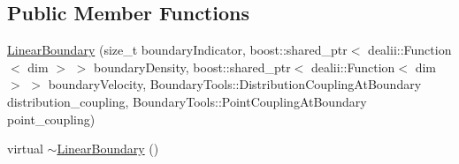 \subsection*{Public Member Functions}
\begin{DoxyCompactItemize}
\item 
\hyperlink{classnatrium_1_1LinearBoundary_a2f11c187ef26ee7e3f6a13ad94876a4e}{LinearBoundary} (size\_\-t boundaryIndicator, boost::shared\_\-ptr$<$ dealii::Function$<$ dim $>$ $>$ boundaryDensity, boost::shared\_\-ptr$<$ dealii::Function$<$ dim $>$ $>$ boundaryVelocity, BoundaryTools::DistributionCouplingAtBoundary distribution\_\-coupling, BoundaryTools::PointCouplingAtBoundary point\_\-coupling)
\item 
\hypertarget{classnatrium_1_1LinearBoundary_a00ee44af34692e1dae616beadf78a8d9}{
virtual \hyperlink{classnatrium_1_1LinearBoundary_a00ee44af34692e1dae616beadf78a8d9}{$\sim$LinearBoundary} ()}
\label{classnatrium_1_1LinearBoundary_a00ee44af34692e1dae616beadf78a8d9}


\end{DoxyCompactItemize}
